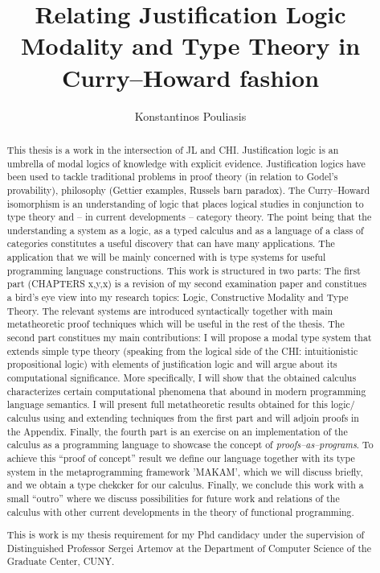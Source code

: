 \documentclass[12pt]{report}
\title{Relating Justification Logic Modality and Type Theory in Curry--Howard fashion}
\author{Konstantinos Pouliasis}
\begin{document}
\maketitle


\begin{abstract}
This thesis is a work in the intersection of \ac{JL} and \ac{CHI}. Justification logic is an umbrella of modal logics of knowledge with explicit evidence. 
Justification logics have been used to tackle traditional problems in proof theory (in relation to Godel's provability), philosophy (Gettier examples, Russels barn paradox). 
The Curry--Howard isomorphism is an understanding of logic that places logical studies in conjunction to type theory and -- in current developments -- 
category theory. The point being that the  understanding a system as a logic, as a typed calculus and as a language of a class of categories constitutes a useful discovery 
that can have many applications.
The application that we will be mainly concerned with is type systems for useful programming language constructions. 
This work  is structured in two parts: 
The first part (CHAPTERS x,y,x) is a revision of my second examination paper and constitues a bird's eye view into my research topics:  
Logic, Constructive Modality and Type Theory. 
The relevant systems are introduced syntactically together with main  metatheoretic proof techniques which will be useful in the rest of the thesis.
The second part constitues my main contributions: I will propose  a modal type system that extends simple type theory (speaking from the logical side of the \ac{CHI}: 
intuitionistic propositional logic) with elements of justification logic and will argue about its computational significance. More specifically, I will show  
that the obtained calculus characterizes  certain computational phenomena that abound in modern programming language semantics. 
I will present full metatheoretic
results obtained for this logic/ calculus using and extending techniques from the first part and will adjoin proofs in the Appendix.
Finally, the fourth part is an exercise
on an implementation of the calculus as a programming language to showcase the concept of \emph{proofs--as--programs}. To achieve this ``proof of concept'' result we define our 
language together with its type system
in the metaprogramming framework 'MAKAM', which we will discuss briefly, 
and we obtain a type chekcker for our calculus. Finally, we conclude this work with a small ``outro'' 
where we discuss possibilities for future work and relations of the calculus with other current developments in the theory of functional programming.

This is work is my thesis requirement for my Phd candidacy under the supervision of Distinguished Professor Sergei Artemov at the Department of 
Computer Science of the Graduate Center, CUNY.
\end{abstract}

\tableofcontents












\nocite{Pfenning2009a, Pfenning2009b}




\end{document}
